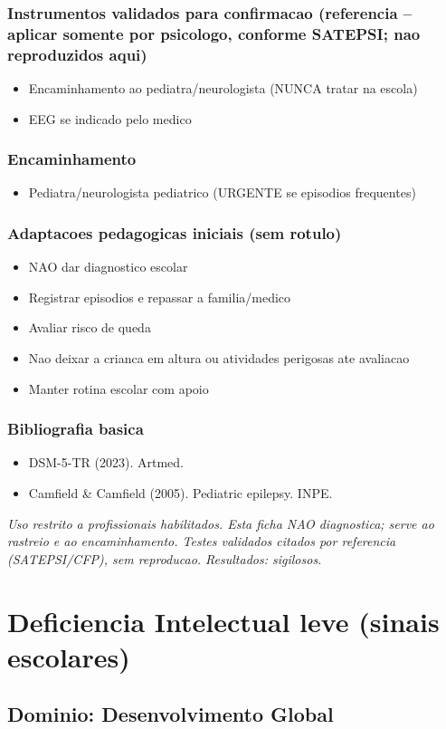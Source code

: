 \documentclass[a4paper,11pt]{book}
\newcommand{\avisolegal}{\par\medskip\noindent\footnotesize\itshape
\color{cinza}Uso restrito a profissionais habilitados. Esta ficha NAO diagnostica;
serve ao rastreio e ao encaminhamento. Testes validados citados por referencia
(SATEPSI/CFP), sem reproducao. Resultados: sigilosos.\color{black}\par}
\begin{document}
\subsection*{Instrumentos validados para confirmacao (referencia -- aplicar somente por psicologo, conforme SATEPSI; nao reproduzidos aqui)}
\begin{itemize}
\item Encaminhamento ao pediatra/neurologista (NUNCA tratar na escola)
\item EEG se indicado pelo medico
\end{itemize}
\subsection*{Encaminhamento}
\begin{itemize}
\item Pediatra/neurologista pediatrico (URGENTE se episodios frequentes)
\end{itemize}
\subsection*{Adaptacoes pedagogicas iniciais (sem rotulo)}
\begin{itemize}
\item NAO dar diagnostico escolar
\item Registrar episodios e repassar a familia/medico
\item Avaliar risco de queda
\item Nao deixar a crianca em altura ou atividades perigosas ate avaliacao
\item Manter rotina escolar com apoio
\end{itemize}
\subsection*{Bibliografia basica}
\begin{itemize}
\item DSM-5-TR (2023). Artmed.
\item Camfield \& Camfield (2005). Pediatric epilepsy. INPE.
\end{itemize}
\avisolegal


\chapter{Deficiencia Intelectual leve (sinais escolares)}
\section*{Dominio: Desenvolvimento Global}
\end{document}
